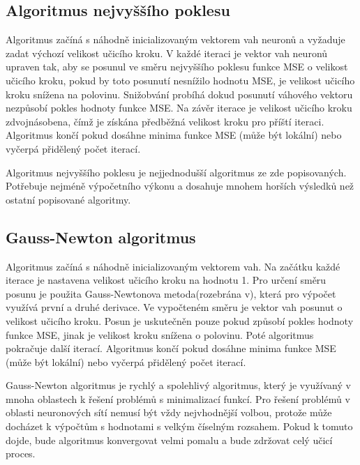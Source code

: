 \documentclass[11pt,twoside,a4paper]{book}
\begin{document}
\subsection{Algoritmus nejvyššího poklesu}
Algoritmus začíná s náhodně inicializovaným vektorem vah neuronů a vyžaduje zadat výchozí velikost učicího kroku. V každé iteraci je vektor vah neuronů upraven tak, aby se posunul ve směru nejvyššího poklesu funkce MSE o velikost učicího kroku, pokud by toto posunutí nesnížilo hodnotu MSE, je velikost učicího kroku snížena na polovinu. Snižobvání probíhá dokud posunutí váhového vektoru nezpůsobí pokles hodnoty funkce MSE.  Na závěr iterace je velikost učicího kroku zdvojnásobena, čímž je získána předběžná velikost kroku pro příští iteraci. Algoritmus končí pokud dosáhne minima funkce MSE (může být lokální) nebo vyčerpá přidělený počet iterací.

Algoritmus nejvyššího poklesu je nejjednodušší algoritmus ze zde popisovaných. Potřebuje nejméně výpočetního výkonu a dosahuje mnohem horších výsledků než ostatní popisované algoritmy.\cite{nndocumentation}
\subsection{Gauss-Newton algoritmus}
Algoritmus začíná s náhodně inicializovaným vektorem vah. Na začátku každé iterace je nastavena velikost učicího kroku na hodnotu 1. Pro určení směru posunu je použita Gauss-Newtonova metoda(rozebrána v\citep{learningmachines}), která pro výpočet využívá první a druhé derivace. Ve vypočteném směru je vektor vah posunut o velikost učicího kroku. Posun je uskutečněn pouze pokud způsobí pokles hodnoty funkce MSE, jinak je velikost kroku snížena o polovinu. Poté algoritmus pokračuje další iterací. Algoritmus končí pokud dosáhne minima funkce MSE (může být lokální) nebo vyčerpá přidělený počet iterací.

Gauss-Newton algoritmus je rychlý a spolehlivý algoritmus, který je využívaný v mnoha oblastech k řešení problémů s minimalizací funkcí. Pro řešení problémů v oblasti neuronových sítí nemusí být vždy nejvhodnější volbou, protože může docházet k výpočtům s hodnotami s velkým číselným rozsahem. Pokud k tomuto dojde, bude algoritmus konvergovat velmi pomalu a bude zdržovat celý učicí proces.\cite{nndocumentation}
\end{document}
